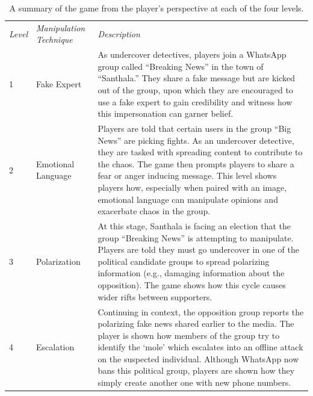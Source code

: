 \documentclass[empirical, authordate]{jote-new-article}
\begin{document}
\begin{table}[h!]

  \begin{fullwidth}
    \caption{A summary of the game from the player's perspective at each of the four levels. }
    \label{tab:table1}


    \begin{tabularx}{\linewidth}{@{}l  l  >{\RaggedRight\arraybackslash}X@{}}

      \emph{Level} & \emph{Manipulation Technique} & \emph{Description}                                                                                                                                                                                                                                                                                                                                                                                        \\
      1            & Fake Expert                   & As undercover detectives, players join a \mbox{WhatsApp} group called “Breaking News” in the town of “Santhala.” They share a fake message but are kicked out of the group, upon which they are encouraged to use a fake expert to gain credibility and witness how this impersonation can garner belief.                                                                                                 \\
      2            & Emotional Language            & Players are told that certain users in the group “Big News” are picking fights. As an undercover detective, they are tasked with spreading content to contribute to the chaos. The game then prompts players to share a fear or anger inducing message. This level shows players how, especially when paired with an image, emotional language can manipulate opinions and exacerbate chaos in the group. \\
      3            & Polarization                  & At this stage, Santhala is facing an election that the group “Breaking News” is attempting to manipulate. Players are told they must go undercover in one of the political candidate groups to spread polarizing information (e.g., damaging information about the opposition). The game shows how this cycle causes wider rifts between supporters.                                                      \\
      4            & Escalation                    & Continuing in context, the opposition group reports the polarizing fake news shared earlier to the media. The player is shown how members of the group try to identify the ‘mole' which escalates into an offline attack on the suspected individual. Although \mbox{WhatsApp} now bans this political group, players are shown how they simply create another one with new phone numbers.                \\
    \end{tabularx}

  \end{fullwidth}

\end{table}
\end{document}
